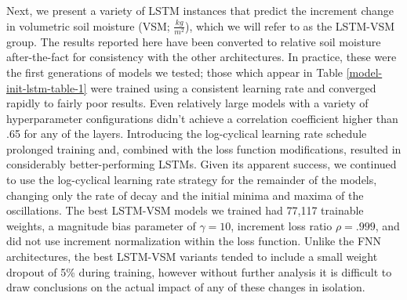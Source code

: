 Next, we present a variety of LSTM instances that predict the increment change in volumetric soil moisture (VSM; $\frac{kg}{m^2}$), which we will refer to as the LSTM-VSM group. The results reported here have been converted to relative soil moisture after-the-fact for consistency with the other architectures. In practice, these were the first generations of models we tested; those which appear in Table \ref{model-init-lstm-table-1} were trained using a consistent learning rate and converged rapidly to fairly poor results. Even relatively large models with a variety of hyperparameter configurations didn't achieve a correlation coefficient higher than .65 for any of the layers. Introducing the log-cyclical learning rate schedule prolonged training and, combined with the loss function modifications, resulted in considerably better-performing LSTMs. Given its apparent success, we continued to use the log-cyclical learning rate strategy for the remainder of the models, changing only the rate of decay and the initial minima and maxima of the oscillations. The best LSTM-VSM models we trained had 77,117 trainable weights, a magnitude bias parameter of $\gamma = 10$, increment loss ratio $\rho = .999$, and did not use increment normalization within the loss function. Unlike the FNN architectures, the best LSTM-VSM variants tended to include a small weight dropout of 5\% during training, however without further analysis it is difficult to draw conclusions on the actual impact of any of these changes in isolation.

